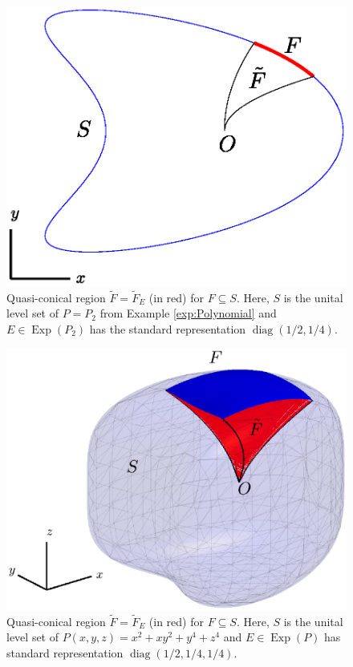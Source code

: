 \documentclass[11pt]{article}
\theoremstyle{remark}
\newcommand\Exp{\operatorname{Exp}}
\newcommand\diag{\operatorname{diag}}
\begin{document}
\begin{figure}[!htb]
    \centering
    \includegraphics[scale=0.7, trim={1cm 1cm 1cm 0.5cm},clip]{level_set_F.eps}
    \caption{Quasi-conical region $\widetilde{F}=\widetilde{F}_E$ (in red) for $F\subseteq S$. Here, $S$ is the unital level set of $P=P_2$ from Example \ref{exp:Polynomial} and $E\in\Exp(P_2)$ has the standard representation $\diag(1/2,1/4)$.}
    \label{fig:level_set_F}
\end{figure}

\begin{figure}[!htb]
    \centering
    \includegraphics[scale=0.7, trim={1cm 3cm 1cm 2cm},clip]{level_set_F_3D.eps}
    \caption{Quasi-conical region $\widetilde{F}=\widetilde{F}_E$ (in red) for $F\subseteq S$. Here, $S$ is the unital level set of $P(x,y,z) = x^2 + xy^2 + y^4 + z^4$ and $E\in\Exp(P)$ has standard representation $\diag(1/2,1/4,1/4)$. }
    \label{fig:level_set_F_3D}
\end{figure}
\end{document}
